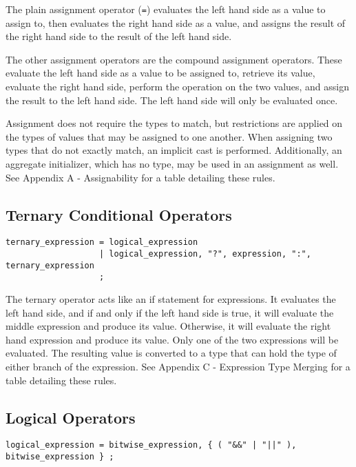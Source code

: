 \documentclass[letterpaper,12pt]{book}
\begin{document}
The plain assignment operator (\texttt{=}) evaluates the left hand side as a value to assign to, then evaluates the right hand side as a value, and assigns the result of the right hand side to the result of the left hand side.

The other assignment operators are the compound assignment operators. These evaluate the left hand side as a value to be assigned to, retrieve its value, evaluate the right hand side, perform the operation on the two values, and assign the result to the left hand side. The left hand side will only be evaluated once.

Assignment does not require the types to match, but restrictions are applied on the types of values that may be assigned to one another. When assigning two types that do not exactly match, an implicit cast is performed. Additionally, an aggregate initializer, which has no type, may be used in an assignment as well. See Appendix A - Assignability for a table detailing these rules.

\subsection{Ternary Conditional Operators}

\begin{lstlisting}[breaklines=true]
ternary_expression = logical_expression
                   | logical_expression, "?", expression, ":", ternary_expression
                   ;
\end{lstlisting}

The ternary operator acts like an if statement for expressions. It evaluates the left hand side, and if and only if the left hand side is true, it will evaluate the middle expression and produce its value. Otherwise, it will evaluate the right hand expression and produce its value. Only one of the two expressions will be evaluated. The resulting value is converted to a type that can hold the type of either branch of the expression. See Appendix C - Expression Type Merging for a table detailing these rules.

\subsection{Logical Operators}

\begin{lstlisting}[breaklines=true]
logical_expression = bitwise_expression, { ( "&&" | "||" ), bitwise_expression } ;
\end{lstlisting}
\end{document}
